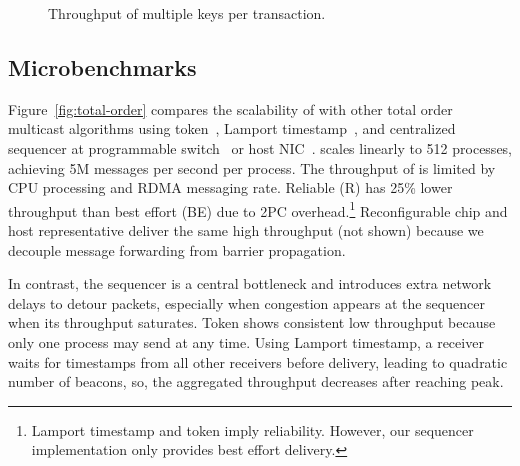 \begin{figure}[t!]
\begin{minipage}{.31\textwidth}
		\centering
		\caption{Throughput of multiple keys per transaction.}
		\label{fig:multishard}
    \end{minipage}
	\hspace{0.01\textwidth}
\vspace{-15pt}
\end{figure}
\fi

\subsection{Microbenchmarks}

Figure~\ref{fig:total-order} compares the scalability of \sys{} with other total order multicast algorithms using token~\cite{rajagopalan1989token}, Lamport timestamp~\cite{lamport1978time}, and centralized sequencer at programmable switch~\cite{eris} or host NIC~\cite{kaminsky2016design}.
\sys{} scales linearly to 512 processes, achieving 5M messages per second per process.
The throughput of \sys is limited by CPU processing and RDMA messaging rate.
Reliable (R) \sys{} has 25\% lower throughput than best effort (BE) \sys{} due to 2PC overhead.\footnote{Lamport timestamp and token imply reliability. However, our sequencer implementation only provides best effort delivery.}
Reconfigurable chip and host representative deliver the same high throughput (not shown) because we decouple message forwarding from barrier propagation.

In contrast, the sequencer is a central bottleneck and introduces extra network delays to detour packets, especially when congestion appears at the sequencer when its throughput saturates.
Token shows consistent low throughput because only one process may send at any time.
Using Lamport timestamp, a receiver waits for timestamps from all other receivers before delivery, leading to quadratic number of beacons, so, the aggregated throughput decreases after reaching peak.


